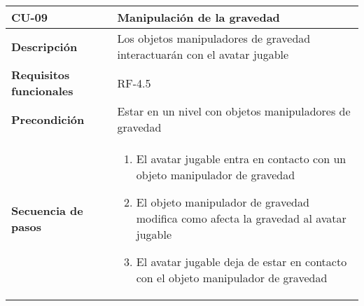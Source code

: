 \begin{tabularx}{\columnwidth}{l|l}
\begin{minipage}{0.25\columnwidth}
\textbf{CU-09} 
\end{minipage}
&
\begin{minipage}{0.65\columnwidth}
Manipulación de la gravedad
\end{minipage}
\\ \hline

\begin{minipage}{0.25\columnwidth}
\textbf{Descripción} 
\end{minipage}
&
\begin{minipage}{0.65\columnwidth}
Los objetos manipuladores de gravedad interactuarán con el avatar jugable
\end{minipage}
\\ \hline

\begin{minipage}{0.25\columnwidth}
\textbf{Requisitos funcionales} 
\end{minipage}
&
\begin{minipage}{0.65\columnwidth}
RF-4.5
\end{minipage}
\\ \hline

\begin{minipage}{0.25\columnwidth}
\textbf{Precondición} 
\end{minipage}
&
\begin{minipage}{0.65\columnwidth}
Estar en un nivel con objetos manipuladores de gravedad
\end{minipage}
\\ \hline

\begin{minipage}{0.25\columnwidth}
\textbf{Secuencia de pasos} 
\end{minipage}
&
\begin{minipage}{0.65\columnwidth}
\begin{enumerate}
\item
El avatar jugable entra en contacto con un objeto manipulador de gravedad
\item
El objeto manipulador de gravedad modifica como afecta la gravedad al avatar jugable
\item
El avatar jugable deja de estar en contacto con el objeto manipulador de gravedad
\end{enumerate}
\end{minipage}
\\ \hline


\end{tabularx}
